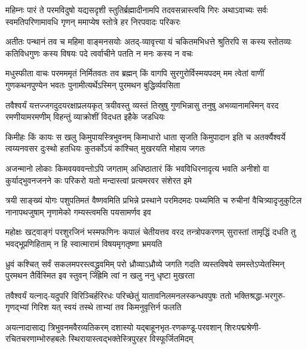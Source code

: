 
\fourlineindentedshloka
{महिम्नः पारं ते परमविदुषो यद्यसदृशी}
{स्तुतिर्ब्रह्मादीनामपि तदवसन्नास्त्वयि गिरः}
{अथाऽवाच्यः सर्वः स्वमतिपरिणामावधि गृणन्}
{ममाप्येष स्तोत्रे हर निरपवादः परिकरः}%

\fourlineindentedshloka
{अतीतः पन्थानं तव च महिमा वाङ्मनसयोः}
{अतद्-व्यावृत्त्या यं चकितमभिधत्ते श्रुतिरपि}
{स कस्य स्तोतव्यः कतिविधगुणः कस्य विषयः}
{पदे त्वर्वाचीने पतति न मनः कस्य न वचः}%

\fourlineindentedshloka
{मधुस्फीता वाचः परमममृतं निर्मितवतः}
{तव ब्रह्मन् किं वागपि सुरगुरोर्विस्मयपदम्}
{मम त्वेतां वाणीं गुणकथनपुण्येन भवतः}
{पुनामीत्यर्थेऽस्मिन् पुरमथन बुद्धिर्व्यवसिता}%

\fourlineindentedshloka
{तवैश्वर्यं यत्तज्जगदुदयरक्षाप्रलयकृत्}
{त्रयीवस्तु व्यस्तं तिस्रुषु गुणभिन्नासु तनुषु}
{अभव्यानामस्मिन् वरद रमणीयामरमणीम्}
{विहन्तुं व्याक्रोशीं विदधत इहैके जडधियः}%

\fourlineindentedshloka
{किमीहः किं कायः स खलु किमुपायस्त्रिभुवनम्}
{किमाधारो धाता सृजति किमुपादान इति च}
{अतर्क्यैश्वर्ये त्वय्यनवसर दुःस्थो हतधियः}
{कुतर्कोऽयं कांश्चित् मुखरयति मोहाय जगतः}%

\fourlineindentedshloka
{अजन्मानो लोकाः किमवयववन्तोऽपि जगताम्}
{अधिष्ठातारं किं भवविधिरनादृत्य भवति}
{अनीशो वा कुर्याद्भुवनजनने कः परिकरो}
{यतो मन्दास्त्वां प्रत्यमरवर संशेरत इमे}%

\fourlineindentedshloka
{त्रयी साङ्ख्यं योगः पशुपतिमतं वैष्णवमिति}
{प्रभिन्ने प्रस्थाने परमिदमदः पथ्यमिति च}
{रुचीनां वैचित्र्यादृजुकुटिल नानापथजुषाम्}
{नृणामेको गम्यस्त्वमसि पयसामर्णव इव}%

\fourlineindentedshloka
{महोक्षः खट्वाङ्गं परशुरजिनं भस्मफणिनः}
{कपालं चेतीयत्तव वरद तन्त्रोपकरणम्}
{सुरास्तां तामृद्धिं दधति तु भवद्भूप्रणिहिताम्}
{न हि स्वात्मारामं विषयमृगतृष्णा भ्रमयति}%

\fourlineindentedshloka
{ध्रुवं कश्चित् सर्वं सकलमपरस्त्वद्\mbox{}ध्रुवमिम्}
{परो ध्रौव्याऽध्रौव्ये जगति गदति व्यस्तविषये}
{समस्तेऽप्येतस्मिन् पुरमथन तैर्विस्मित इव}
{स्तुवन् जिह्रेमि त्वां न खलु ननु धृष्टा मुखरता}%

\fourlineindentedshloka
{तवैश्वर्यं यत्नाद्-यदुपरि विरिञ्चिर्हरिरधः}
{परिच्छेतुं यातावनिलमनलस्कन्धवपुषः}
{ततो भक्तिश्रद्धा-भरगुरु-गृणद्भ्यां गिरिश यत्}
{स्वयं तस्थे ताभ्यां तव किमनुवृत्तिर्न फलति}%

\fourlineindentedshloka
{अयत्नादासाद्य त्रिभुवनमवैरव्यतिकरम्}
{दशास्यो यद्बाहूनभृत-रणकण्डू-परवशान्}
{शिरःपद्मश्रेणी-रचितचरणाम्भोरुहबलेः}
{स्थिरायास्त्वद्भक्तेस्त्रिपुरहर विस्फूर्जितमिदम्}%

